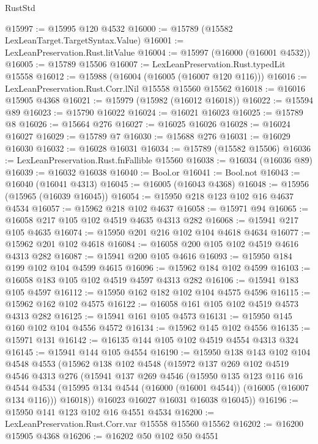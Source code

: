 \begin{lexlean}{RustStd}
\begin{coremodule}
@15997 := @15995 @120 @4532
@16000 := @15789 (@15582 LexLeanTarget.TargetSyntax.Value)
@16001 := LexLeanPreservation.Rust.litValue
@16004 := @15997 (@16000 (@16001 @4532))
@16005 := @15789 @15506
@16007 := LexLeanPreservation.Rust.typedLit @15558
@16012 := @15988 (@16004 (@16005 (@16007 @120 @116)))
@16016 := LexLeanPreservation.Rust.Corr.lNil @15558 @15560 @15562
@16018 := @16016 @15905 @4368
@16021 := @15979 (@15982 (@16012 @16018))
@16022 := @15594 @89
@16023 := @15790 @16022
@16024 := @16021 @16023
@16025 := @15789 @8
@16026 := @15664 @276
@16027 := @16025 @16026
@16028 := @16024 @16027
@16029 := @15789 @7
@16030 := @15688 @276
@16031 := @16029 @16030
@16032 := @16028 @16031
@16034 := @15789 (@15582 @15506)
@16036 := LexLeanPreservation.Rust.fnFallible @15560
@16038 := @16034 (@16036 @89)
@16039 := @16032 @16038
@16040 := Bool.or
@16041 := Bool.not
@16043 := @16040 (@16041 @4313)
@16045 := @16005 (@16043 @4368)
@16048 := @15956 (@15965 (@16039 @16045))
@16054 := @15950 @218 @123 @102 @16 @4637 @4534
@16057 := @15962 @218 @102 @4637
@16058 := @15971 @94
@16065 := @16058 @217 @105 @102 @4519 @4635 @4313 @282
@16068 := @15941 @217 @105 @4635
@16074 := @15950 @201 @216 @102 @104 @4618 @4634
@16077 := @15962 @201 @102 @4618
@16084 := @16058 @200 @105 @102 @4519 @4616 @4313 @282
@16087 := @15941 @200 @105 @4616
@16093 := @15950 @184 @199 @102 @104 @4599 @4615
@16096 := @15962 @184 @102 @4599
@16103 := @16058 @183 @105 @102 @4519 @4597 @4313 @282
@16106 := @15941 @183 @105 @4597
@16112 := @15950 @162 @182 @102 @104 @4575 @4596
@16115 := @15962 @162 @102 @4575
@16122 := @16058 @161 @105 @102 @4519 @4573 @4313 @282
@16125 := @15941 @161 @105 @4573
@16131 := @15950 @145 @160 @102 @104 @4556 @4572
@16134 := @15962 @145 @102 @4556
@16135 := @15971 @131
@16142 := @16135 @144 @105 @102 @4519 @4554 @4313 @324
@16145 := @15941 @144 @105 @4554
@16190 := @15950
    @138
    @143
    @102
    @104
    @4548
    @4553
    (@15962
      @138
      @102
      @4548
      (@15972
        @137
        @269
        @102
        @4519
        @4546
        @4313
        @276
        (@15941
          @137
          @269
          @4546
          (@15950
            @135
            @123
            @116
            @16
            @4544
            @4534
            (@15995 @134 @4544 (@16000 (@16001 @4544)) (@16005 (@16007 @134 @116)))
            @16018))
        @16023
        @16027
        @16031
        @16038
        @16045))
@16196 := @15950 @141 @123 @102 @16 @4551 @4534
@16200 := LexLeanPreservation.Rust.Corr.var @15558 @15560 @15562
@16202 := @16200 @15905 @4368
@16206 := @16202 @50 @102 @50 @4551

\end{coremodule}
\end{lexlean}

